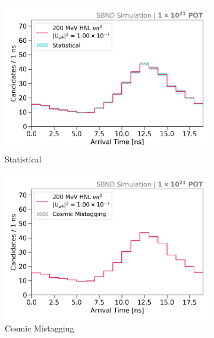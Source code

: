\begin{figure}[htbp!]
        \begin{subfigure}[b]{0.45\textwidth}   
            \centering 
            \includegraphics[width=\textwidth]{hnl_statistics_error}
            \caption{Statistical}%
            \label{fig:hnl_stat}
        \end{subfigure}
        \hfill
        \begin{subfigure}[b]{0.45\textwidth}   
            \centering 
            \includegraphics[width=\textwidth]{hnl_mistagging_error}
            \caption{Cosmic Mistagging}%
            \label{fig:hnl_mistag}
        \end{subfigure}
        \centering
        \begin{subfigure}[b]{0.45\textwidth}   
            \centering 

\end{subfigure}
\end{figure}
